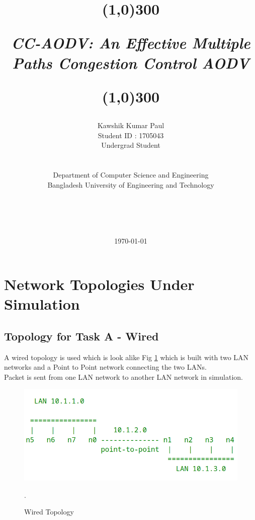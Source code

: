 \documentclass[12pt, a4paper]{article}
\title{
	\line(1,0){300}
	\endgraf\bigskip
	\Huge
	\begin{center}
		\emph{CC-AODV: An Effective Multiple Paths Congestion Control AODV} 
		
	\end{center}
	\line(1,0){300}
	\bigskip
	\bigskip
}
\author{
    \large{Kawshik Kumar Paul}\\
	\large{Student ID : 1705043}\\
	\large{Undergrad Student}\\\\\\
	\Large{Department of Computer Science and Engineering}\\
    \Large{Bangladesh University of Engineering and Technology}\\\\\\\\\\
}
\date{
	\endgraf\bigskip
	\Large{\today}
}
\begin{document}
\maketitle
\pagebreak
\tableofcontents
\pagebreak
\section{Network Topologies Under Simulation}
\subsection{Topology for Task A - Wired}
A wired topology is used which is look alike Fig \ref{fig:task_a_wired} which is built with two LAN networks and a Point to Point network connecting the two LANs.\\
Packet is sent from one LAN network to another LAN network in simulation.
\begin{figure}[H]
\centering
\includegraphics[scale = 0.6]{images/wired-01.png}
\caption{Wired Topology}.
\label{fig:task_a_wired}
\end{figure}
\end{document}
